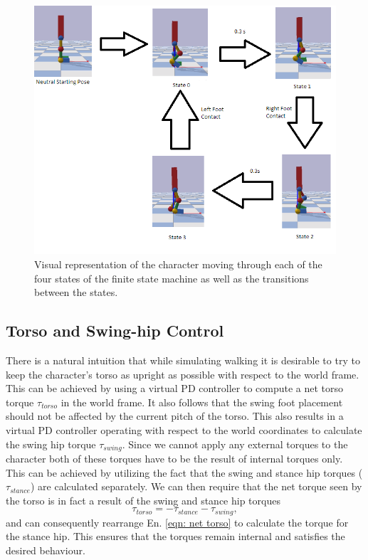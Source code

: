 \documentclass[12pt, a4paper]{article}
\begin{document}
  
\begin{figure}
\begin{center}
\includegraphics[scale=0.8]{finite_state}
\caption{Visual representation of the character moving through each of the four states of the finite state machine as well as the transitions between the states.}
\label{fig: finite state}
\end{center}
\end{figure}

\subsection{Torso and Swing-hip Control}
\label{subsec: torso swing hip control}
There is a natural intuition that while simulating walking it is desirable to try to keep the character's torso as upright as possible with respect to the world frame. This can be achieved by using a virtual PD controller to compute a net torso torque $\tau_{torso}$ in the world frame. It also follows that the swing  foot placement should not be affected by the current pitch of the torso. This also results in a virtual PD controller operating with respect to the world coordinates to calculate the swing hip torque $\tau_{swing}$. Since we cannot apply any external torques to the character both of these torques have to be the result of internal torques only. This can be achieved by utilizing the fact that the swing and stance hip torques ($\tau_{stance}$) are calculated separately. We can then require that the net torque seen by the torso is in fact a result of the swing and stance hip torques
\begin{equation}
\tau_{torso} = -\tau_{stance} - \tau_{swing},
\label{eqn: net torso}
\end{equation}
\noindent
and can consequently rearrange En. \ref{eqn: net torso} to calculate the torque for the stance hip. This ensures that the torques remain internal and satisfies the desired behaviour.
\end{document}
